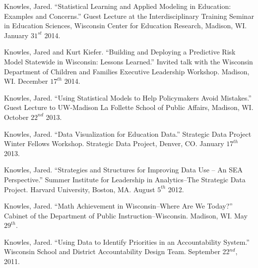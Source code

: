 \documentclass[margin,line]{res}
\begin{document}
\begin{resume}
Knowles, Jared. ``Statistical Learning and Applied Modeling in Education: Examples 
and Concerns.'' Guest Lecture at the Interdisciplinary Training Seminar in Education Sciences, Wisconsin Center for Education Research, Madison, WI. January $31^{st}$ 2014.

Knowles, Jared and Kurt Kiefer. ``Building and Deploying a Predictive Risk Model Statewide in Wisconsin: Lessons Learned.'' Invited talk with the 
Wisconsin Department of Children and Families Executive Leadership Workshop. Madison, WI. December $17^{th}$ 2014.

Knowles, Jared. ``Using Statistical Models to Help Policymakers Avoid Mistakes.'' Guest Lecture to UW-Madison La Follette School of Public Affairs, Madison, WI. October $22^{nd}$ 2013.

Knowles, Jared. ``Data Visualization for Education Data.'' Strategic Data Project Winter Fellows Workshop. Strategic Data Project, Denver, CO. January $17^{th}$ 2013. 

Knowles, Jared. ``Strategies and Structures for Improving Data Use -- An SEA Perspective.'' Summer Institute for Leadership in Analytics--The Strategic Data Project. Harvard University, Boston, MA. August $5^{th}$ 2012. 


Knowles, Jared. ``Math Achievement in Wisconsin--Where Are We Today?'' Cabinet of the Department of Public Instruction--Wisconsin. Madison, WI. May $29^{th}$. 



Knowles, Jared. ``Using Data to Identify Priorities in an Accountability System.'' Wisconsin School and District Accountability Design Team. September 22$^{nd}$, 2011.



\end{resume}
\end{document}
